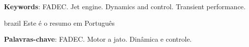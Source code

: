 
\setlength{\absparsep}{18pt} %
\begin{resumo}
 \textbf{Keywords}: FADEC. Jet engine. Dynamics and control. Transient performance.
\end{resumo}

\begin{resumo}[Resumo]
 \begin{otherlanguage*}{brazil}
   Este é o resumo em Português

   \vspace{\onelineskip}
 
   \noindent 
   \textbf{Palavras-chave}: FADEC. Motor a jato. Dinâmica e controle.
 \end{otherlanguage*}
\end{resumo}

